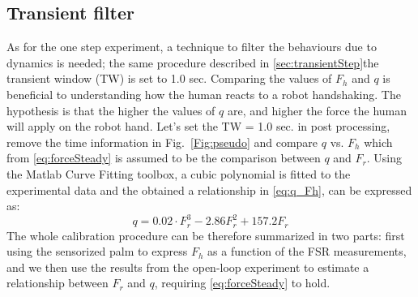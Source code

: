 \subsection{Transient filter}\label{sec:transientPseudo}
As for the one step experiment, a technique to filter the behaviours due to dynamics is needed; the same procedure described in \ref{sec:transientStep}the transient window (TW) is set to 1.0 sec.
Comparing the values of $F_{h}$ and $q$ is beneficial to understanding how the human reacts to a robot handshaking. The hypothesis is that the higher the values of $q$ are, and higher the force the human will apply on the robot hand. %
Let's set the TW = 1.0 sec. in post processing, remove the time information in Fig.~\ref{Fig:pseudo} and compare $q$ vs. $F_{h}$ which from \eqref{eq:forceSteady} is assumed to be the comparison between $q$ and $F_{r}$.
Using the Matlab Curve Fitting toolbox, a cubic polynomial is fitted to the experimental data and the obtained a relationship in \eqref{eq:q_Fh}, can be expressed as:
%
\begin{equation} 
q= 0.02 \cdot F_{r}^3 - 2.86 F_{r}^2 + 157.2 F_{r}
\label{eq:q_vs_Fr}
\end{equation}
%
The whole calibration procedure can be therefore summarized in two parts: first using the sensorized palm to express $F_{h}$ as a function of the FSR measurements, and we then use the results from the open-loop experiment to estimate a relationship between $F_{r}$ and $q$, requiring \eqref{eq:forceSteady} to hold.

